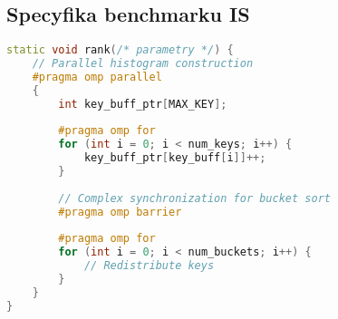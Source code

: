 \subsection{Specyfika benchmarku IS}
\begin{lstlisting}[language=C++, caption={Implementacja benchmarku IS w języku C++ z OpenMP}, label={lst:is_openmp}]
static void rank(/* parametry */) {
    // Parallel histogram construction
    #pragma omp parallel
    {
        int key_buff_ptr[MAX_KEY];
        
        #pragma omp for
        for (int i = 0; i < num_keys; i++) {
            key_buff_ptr[key_buff[i]]++;
        }
        
        // Complex synchronization for bucket sort
        #pragma omp barrier
        
        #pragma omp for
        for (int i = 0; i < num_buckets; i++) {
            // Redistribute keys
        }
    }
}
\end{lstlisting}